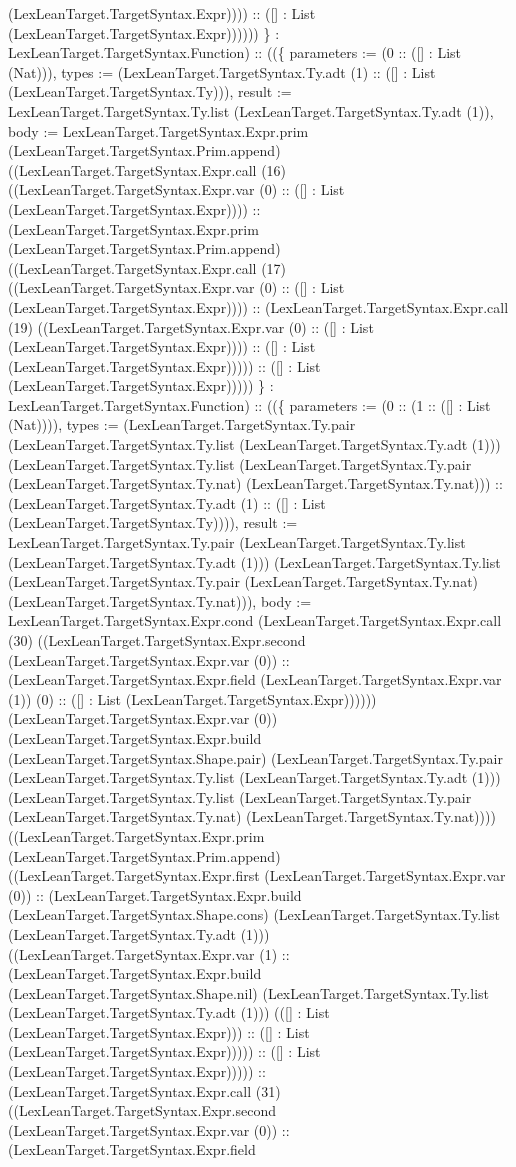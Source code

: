 \documentclass[11pt]{article}
\begin{document}
(LexLeanTarget.TargetSyntax.Expr)))) :: ([] : List (LexLeanTarget.TargetSyntax.Expr)))))) \} : LexLeanTarget.TargetSyntax.Function) :: ((\{ parameters := (0 :: ([] : List (Nat))), types := (LexLeanTarget.TargetSyntax.Ty.adt (1) :: ([] : List (LexLeanTarget.TargetSyntax.Ty))), result := LexLeanTarget.TargetSyntax.Ty.list (LexLeanTarget.TargetSyntax.Ty.adt (1)), body := LexLeanTarget.TargetSyntax.Expr.prim (LexLeanTarget.TargetSyntax.Prim.append) ((LexLeanTarget.TargetSyntax.Expr.call (16) ((LexLeanTarget.TargetSyntax.Expr.var (0) :: ([] : List (LexLeanTarget.TargetSyntax.Expr)))) :: (LexLeanTarget.TargetSyntax.Expr.prim (LexLeanTarget.TargetSyntax.Prim.append) ((LexLeanTarget.TargetSyntax.Expr.call (17) ((LexLeanTarget.TargetSyntax.Expr.var (0) :: ([] : List (LexLeanTarget.TargetSyntax.Expr)))) :: (LexLeanTarget.TargetSyntax.Expr.call (19) ((LexLeanTarget.TargetSyntax.Expr.var (0) :: ([] : List (LexLeanTarget.TargetSyntax.Expr)))) :: ([] : List (LexLeanTarget.TargetSyntax.Expr))))) :: ([] : List (LexLeanTarget.TargetSyntax.Expr))))) \} : LexLeanTarget.TargetSyntax.Function) :: ((\{ parameters := (0 :: (1 :: ([] : List (Nat)))), types := (LexLeanTarget.TargetSyntax.Ty.pair (LexLeanTarget.TargetSyntax.Ty.list (LexLeanTarget.TargetSyntax.Ty.adt (1))) (LexLeanTarget.TargetSyntax.Ty.list (LexLeanTarget.TargetSyntax.Ty.pair (LexLeanTarget.TargetSyntax.Ty.nat) (LexLeanTarget.TargetSyntax.Ty.nat))) :: (LexLeanTarget.TargetSyntax.Ty.adt (1) :: ([] : List (LexLeanTarget.TargetSyntax.Ty)))), result := LexLeanTarget.TargetSyntax.Ty.pair (LexLeanTarget.TargetSyntax.Ty.list (LexLeanTarget.TargetSyntax.Ty.adt (1))) (LexLeanTarget.TargetSyntax.Ty.list (LexLeanTarget.TargetSyntax.Ty.pair (LexLeanTarget.TargetSyntax.Ty.nat) (LexLeanTarget.TargetSyntax.Ty.nat))), body := LexLeanTarget.TargetSyntax.Expr.cond (LexLeanTarget.TargetSyntax.Expr.call (30) ((LexLeanTarget.TargetSyntax.Expr.second (LexLeanTarget.TargetSyntax.Expr.var (0)) :: (LexLeanTarget.TargetSyntax.Expr.field (LexLeanTarget.TargetSyntax.Expr.var (1)) (0) :: ([] : List (LexLeanTarget.TargetSyntax.Expr)))))) (LexLeanTarget.TargetSyntax.Expr.var (0)) (LexLeanTarget.TargetSyntax.Expr.build (LexLeanTarget.TargetSyntax.Shape.pair) (LexLeanTarget.TargetSyntax.Ty.pair (LexLeanTarget.TargetSyntax.Ty.list (LexLeanTarget.TargetSyntax.Ty.adt (1))) (LexLeanTarget.TargetSyntax.Ty.list (LexLeanTarget.TargetSyntax.Ty.pair (LexLeanTarget.TargetSyntax.Ty.nat) (LexLeanTarget.TargetSyntax.Ty.nat)))) ((LexLeanTarget.TargetSyntax.Expr.prim (LexLeanTarget.TargetSyntax.Prim.append) ((LexLeanTarget.TargetSyntax.Expr.first (LexLeanTarget.TargetSyntax.Expr.var (0)) :: (LexLeanTarget.TargetSyntax.Expr.build (LexLeanTarget.TargetSyntax.Shape.cons) (LexLeanTarget.TargetSyntax.Ty.list (LexLeanTarget.TargetSyntax.Ty.adt (1))) ((LexLeanTarget.TargetSyntax.Expr.var (1) :: (LexLeanTarget.TargetSyntax.Expr.build (LexLeanTarget.TargetSyntax.Shape.nil) (LexLeanTarget.TargetSyntax.Ty.list (LexLeanTarget.TargetSyntax.Ty.adt (1))) (([] : List (LexLeanTarget.TargetSyntax.Expr))) :: ([] : List (LexLeanTarget.TargetSyntax.Expr))))) :: ([] : List (LexLeanTarget.TargetSyntax.Expr))))) :: (LexLeanTarget.TargetSyntax.Expr.call (31) ((LexLeanTarget.TargetSyntax.Expr.second (LexLeanTarget.TargetSyntax.Expr.var (0)) :: (LexLeanTarget.TargetSyntax.Expr.field 
\end{document}
